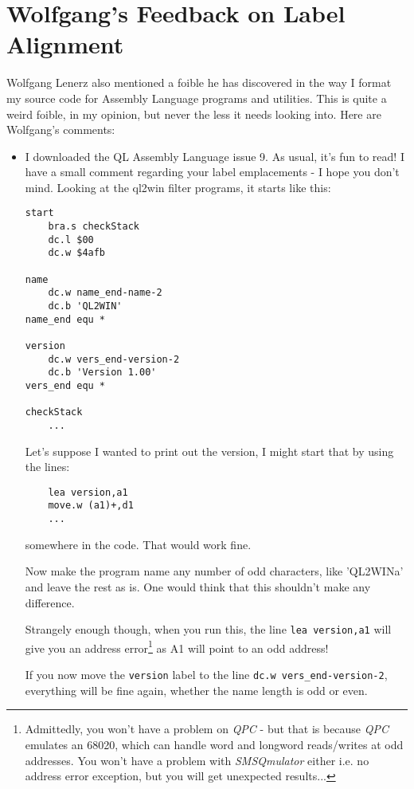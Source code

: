 \section{Wolfgang's Feedback on Label Alignment}

Wolfgang Lenerz also mentioned a foible he has discovered in the way
I format my source code for Assembly Language programs and utilities.
This is quite a weird foible, in my opinion, but never the less it
needs looking into. Here are Wolfgang's comments:
\begin{itemize}
\item I downloaded the QL Assembly Language issue 9. As usual, it's fun
to read! I have a small comment regarding your label emplacements
- I hope you don't mind. Looking at the ql2win filter programs, it
starts like this:

\begin{lstlisting}
start
    bra.s checkStack
    dc.l $00
    dc.w $4afb

name
    dc.w name_end-name-2
    dc.b 'QL2WIN'
name_end equ *

version
    dc.w vers_end-version-2
    dc.b 'Version 1.00'
vers_end equ *

checkStack
    ...
\end{lstlisting}

Let's suppose I wanted to print out the version, I might start that
by using the lines:

\begin{lstlisting}
    lea version,a1
    move.w (a1)+,d1
    ...
\end{lstlisting}

somewhere in the code. That would work fine.

Now make the program name any number of odd characters, like 'QL2WINa'
and leave the rest as is. One would think that this shouldn't make
any difference.

Strangely enough though, when you run this, the line \lstinline[showstringspaces=false]!lea version,a1!
will give you an address error\footnote{Admittedly, you won't have a problem on \emph{QPC} - but that is because
\emph{QPC} emulates an 68020, which can handle word and longword reads/writes
at odd addresses. You won't have a problem with \emph{SMSQmulator}
either i.e. no address error exception, but you will get \textquotedbl unexpected
results\textquotedbl ...} as A1 will point to an odd address!

If you now move the \texttt{version} label to the line \texttt{dc.w
vers\_end-version-2}, everything will be fine again, whether the name
length is odd or even.


\end{itemize}
